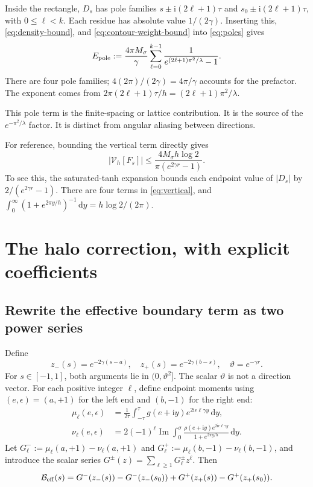 \documentclass[11pt]{article}
\newcommand{\ii}{\mathrm i}
\newcommand{\dd}{\,\mathrm d}
\newcommand{\Imag}{\operatorname{Im}}
\begin{document}
Inside the rectangle, $D_s$ has pole families
$s\pm\ii(2\ell+1)\tau$ and $s_0\pm\ii(2\ell+1)\tau$, with $0\le\ell<k$. Each residue has absolute value $1/(2\gamma)$. Inserting this, \eqref{eq:density-bound}, and \eqref{eq:contour-weight-bound} into \eqref{eq:poles} gives
\begin{equation}
 E_{\rm pole}:=\frac{4\pi M_\sigma}{\gamma}
 \sum_{\ell=0}^{k-1}\frac1{e^{(2\ell+1)\pi^2/\lambda}-1}.
 \label{eq:exact-p-bound}
\end{equation}
There are four pole families; $4(2\pi)/(2\gamma)=4\pi/\gamma$ accounts for the prefactor. The exponent comes from
$2\pi(2\ell+1)\tau/h=(2\ell+1)\pi^2/\lambda$.

This pole term is the finite-spacing or lattice contribution. It is the source of the $e^{-\pi^2/\lambda}$ factor. It is distinct from angular aliasing between directions.

For reference, bounding the vertical term directly gives
\begin{equation}
 |\mathcal V_h[F_s]|\le
 \frac{4M_\sigma h\log2}{\pi(e^{2\gamma r}-1)}.
 \label{eq:v-bound}
\end{equation}
To see this, the saturated-tanh expansion bounds each endpoint value of $|D_s|$ by $2/(e^{2\gamma r}-1)$. There are four terms in \eqref{eq:vertical}, and
$\int_0^\infty(1+e^{2\pi y/h})^{-1}\dd y=h\log2/(2\pi)$.

\section{The halo correction, with explicit coefficients}
\subsection{Rewrite the effective boundary term as two power series}

Define
\[
 z_-(s)=e^{-2\gamma(s-a)},\quad z_+(s)=e^{-2\gamma(b-s)},\quad
 \vartheta=e^{-\gamma r}.
\]
For $s\in[-1,1]$, both arguments lie in $(0,\vartheta^2]$. The scalar $\vartheta$ is not a direction vector. For each positive integer $\ell$, define endpoint moments using $(e,\epsilon)=(a,+1)$ for the left end and $(b,-1)$ for the right end:
\begin{align}
 \mu_\ell(e,\epsilon)&=\frac1{2\tau}\int_{-\tau}^{\tau}
 g(e+\ii y)e^{2\ii\epsilon\ell\gamma y}\dd y,
 \label{eq:mu}\\
 \nu_\ell(e,\epsilon)&=2(-1)^\ell\Imag\int_0^\sigma
 \frac{\rho(e+\ii y)e^{2\ii\epsilon\ell\gamma y}}
 {1+e^{2\pi y/h}}\dd y.
 \label{eq:nu}
\end{align}
Let $G_\ell^-:=\mu_\ell(a,+1)-\nu_\ell(a,+1)$ and
$G_\ell^+:=\mu_\ell(b,-1)-\nu_\ell(b,-1)$, and introduce the scalar series
$G^\pm(z)=\sum_{\ell\ge1}G_\ell^\pm z^\ell$. Then
\begin{equation}
 \mathcal B_{\rm eff}(s)=
 G^-(z_-(s))-G^-(z_-(s_0))+
 G^+(z_+(s))-G^+(z_+(s_0)).
 \label{eq:boundary-series}
\end{equation}
\end{document}
